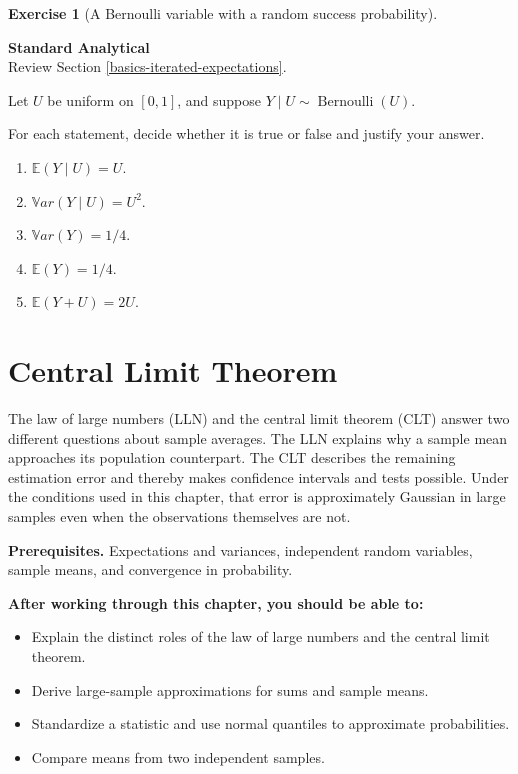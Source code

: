 \documentclass[
  11pt,
]{book}
\providecommand{\tightlist}{%
  \setlength{\itemsep}{0pt}\setlength{\parskip}{0pt}}
\theoremstyle{definition}
\theoremstyle{definition}
\theoremstyle{definition}
\newtheorem{exercise}{Exercise}[chapter]
\theoremstyle{definition}
\theoremstyle{remark}
\begin{document}
\begin{exercisebox}

\begin{exercise}[A Bernoulli variable with a random success probability]
\protect\hypertarget{exr:basics-random-bernoulli}{}\label{exr:basics-random-bernoulli}

\textbf{Standard \textbar{} Analytical}\\
Review Section \ref{basics-iterated-expectations}.

Let \(U\) be uniform on \([0,1]\), and suppose \(Y\mid U\sim\operatorname{Bernoulli}(U)\).

For each statement, decide whether it is true or false and justify your answer.

\begin{enumerate}
\def\labelenumi{\arabic{enumi}.}
\tightlist
\item
  \(\mathbb{E}(Y\mid U)=U\).
\item
  \(\mathbb{V}ar(Y\mid U)=U^2\).
\item
  \(\mathbb{V}ar(Y)=1/4\).
\item
  \(\mathbb{E}(Y)=1/4\).
\item
  \(\mathbb{E}(Y+U)=2U\).
\end{enumerate}

\end{exercise}

\end{exercisebox}

\chapter{Central Limit Theorem}\label{TCL}

The law of large numbers (LLN) and the central limit theorem (CLT) answer two different questions about sample averages. The LLN explains why a sample mean approaches its population counterpart. The CLT describes the remaining estimation error and thereby makes confidence intervals and tests possible. Under the conditions used in this chapter, that error is approximately Gaussian in large samples even when the observations themselves are not.

\textbf{Prerequisites.} Expectations and variances, independent random variables, sample means, and convergence in probability.

\textbf{After working through this chapter, you should be able to:}

\begin{itemize}
\tightlist
\item
  Explain the distinct roles of the law of large numbers and the central limit theorem.
\item
  Derive large-sample approximations for sums and sample means.
\item
  Standardize a statistic and use normal quantiles to approximate probabilities.
\item
  Compare means from two independent samples.
\end{itemize}
\end{document}
